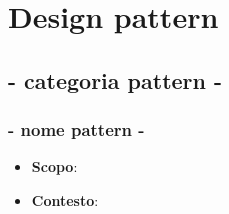 \section{Design pattern}


\subsection{ - categoria pattern - }

\subsubsection{ - nome pattern - }

\begin{itemize}

	\item \textbf{Scopo}:
	\item \textbf{Contesto}:

\end{itemize}
